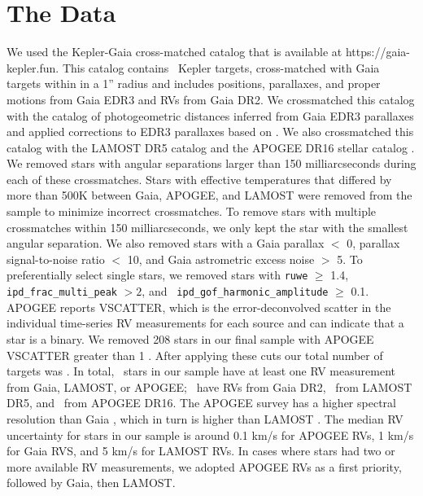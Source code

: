 \section{The Data}
\label{sec:data}

We used the Kepler-Gaia cross-matched catalog that is available at
https://gaia-kepler.fun.
This catalog contains \nfun\ Kepler targets, cross-matched with Gaia targets
within in a 1'' radius and includes positions, parallaxes, and proper motions
from Gaia EDR3 and RVs from Gaia DR2.
We crossmatched this catalog with the catalog of photogeometric
distances inferred from Gaia EDR3 parallaxes \citep{bailer-jones2021} and
applied corrections to EDR3 parallaxes based on \citet{lindegren2021b}.
We also crossmatched this catalog with the LAMOST DR5 catalog and the APOGEE
DR16 stellar catalog \citep{cui2012, apogee_dr16, xiang2019}.
We removed stars with angular separations larger than 150 milliarcseconds
during each of these crossmatches.
Stars with effective temperatures that differed by more than 500K between
Gaia, APOGEE, and LAMOST were removed from the sample to minimize incorrect
crossmatches.
To remove stars with multiple crossmatches within 150 milliarcseconds, we only
kept the star with the smallest angular separation.
We also removed stars with a Gaia parallax $<$ 0, parallax signal-to-noise
ratio $<$ 10, and Gaia astrometric excess noise $>$ 5.
To preferentially select single stars, we removed stars with {\tt ruwe} $\geq$
1.4, {\tt ipd\_frac\_multi\_peak} $>2$, and {\tt
ipd\_gof\_harmonic\_amplitude} $\geq$ 0.1.
APOGEE reports VSCATTER, which is the error-deconvolved scatter in the
individual time-series RV measurements for each source and can indicate that a
star is a binary.
We removed 208 stars in our final sample with APOGEE VSCATTER greater than 1
\kms.
After applying these cuts our total number of targets was \nstars.
In total, \nrv\ stars in our sample have at least one RV measurement from
Gaia, LAMOST, or APOGEE; \ngaia\ have RVs from Gaia DR2, \nlamost\ from LAMOST
DR5, and \napogee\ from APOGEE DR16.
The APOGEE survey \citep[R $=$ 22,500;][]{apogee} has a higher spectral
resolution than Gaia \citep[R $=$ 11,500;][]{cropper2018}, which in turn is
higher than LAMOST \citep[R $=$ 1,800;][]{zhao2012}.
The median RV uncertainty for stars in our sample is around 0.1 km/s for
APOGEE RVs, 1 km/s for Gaia RVS, and 5 km/s for
LAMOST RVs.
In cases where stars had two or more available RV measurements, we adopted
APOGEE RVs as a first priority, followed by Gaia, then LAMOST.


